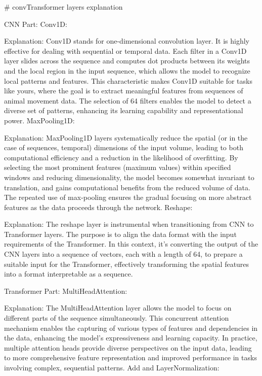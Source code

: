 # convTransformer layers explanation

CNN Part:
Conv1D:

Explanation: Conv1D stands for one-dimensional convolution layer. It is highly effective for dealing with sequential or temporal data. Each filter in a Conv1D layer slides across the sequence and computes dot products between its weights and the local region in the input sequence, which allows the model to recognize local patterns and features. This characteristic makes Conv1D suitable for tasks like yours, where the goal is to extract meaningful features from sequences of animal movement data. The selection of 64 filters enables the model to detect a diverse set of patterns, enhancing its learning capability and representational power.
MaxPooling1D:

Explanation: MaxPooling1D layers systematically reduce the spatial (or in the case of sequences, temporal) dimensions of the input volume, leading to both computational efficiency and a reduction in the likelihood of overfitting. By selecting the most prominent features (maximum values) within specified windows and reducing dimensionality, the model becomes somewhat invariant to translation, and gains computational benefits from the reduced volume of data. The repeated use of max-pooling ensures the gradual focusing on more abstract features as the data proceeds through the network.
Reshape:

Explanation: The reshape layer is instrumental when transitioning from CNN to Transformer layers. The purpose is to align the data format with the input requirements of the Transformer. In this context, it’s converting the output of the CNN layers into a sequence of vectors, each with a length of 64, to prepare a suitable input for the Transformer, effectively transforming the spatial features into a format interpretable as a sequence.

Transformer Part:
MultiHeadAttention:

Explanation: The MultiHeadAttention layer allows the model to focus on different parts of the sequence simultaneously. This concurrent attention mechanism enables the capturing of various types of features and dependencies in the data, enhancing the model's expressiveness and learning capacity. In practice, multiple attention heads provide diverse perspectives on the input data, leading to more comprehensive feature representation and improved performance in tasks involving complex, sequential patterns.
Add and LayerNormalization:


